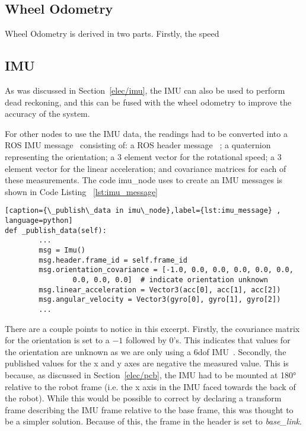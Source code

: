 \subsection{Wheel Odometry}\label{soft/odometry/design}

Wheel Odometry is derived in two parts. Firstly, the speed


\subsection{IMU}\label{soft/odometry/imu}

As was discussed in Section~\ref{elec/imu}, the IMU can also be used to 
perform dead reckoning, and this can be fused with the wheel odometry to 
improve the accuracy of the system.

For other nodes to use the IMU data, the readings had to be converted into 
a ROS IMU message~\cite{ROSIMUMsg} consisting of: a ROS header message~
\cite{ROSHeaderMsg}; a quaternion representing the orientation; a 3 
element vector for the rotational speed; a 3 element vector for the linear 
acceleration; and covariance matrices for each of these measurements. The 
code imu\_node uses to create an IMU messages is shown in Code Listing~
\ref{lst:imu_message}


\begin{lstlisting}[caption={\_publish\_data in imu\_node},label={lst:imu_message} , language=python]
def _publish_data(self):
        ...
        msg = Imu()
        msg.header.frame_id = self.frame_id
        msg.orientation_covariance = [-1.0, 0.0, 0.0, 0.0, 0.0, 0.0,
                0.0, 0.0, 0.0]  # indicate orientation unknown
        msg.linear_acceleration = Vector3(acc[0], acc[1], acc[2])
        msg.angular_velocity = Vector3(gyro[0], gyro[1], gyro[2])
        ...
\end{lstlisting}

There are a couple points to notice in this excerpt. Firstly, the 
covariance matrix for the orientation is set to a $-1$ followed by 0's. 
This indicates that values for the orientation are unknown as we are only 
using a 6dof IMU~\cite{ROSIMUMsg}. Secondly, the published values for the 
x and y axes are negative the measured value. This is because, as 
discussed in Section~\ref{elec/pcb}, the IMU had to be mounted at 
\ang{180} relative to the robot frame (i.e. the x axis in the IMU faced 
towards the back of the robot). While this would be possible to correct by 
declaring a transform frame describing the IMU frame relative to the base 
frame, this was thought to be a simpler solution. Because of this, the 
frame in the header is set to \textit{base\_link}.


